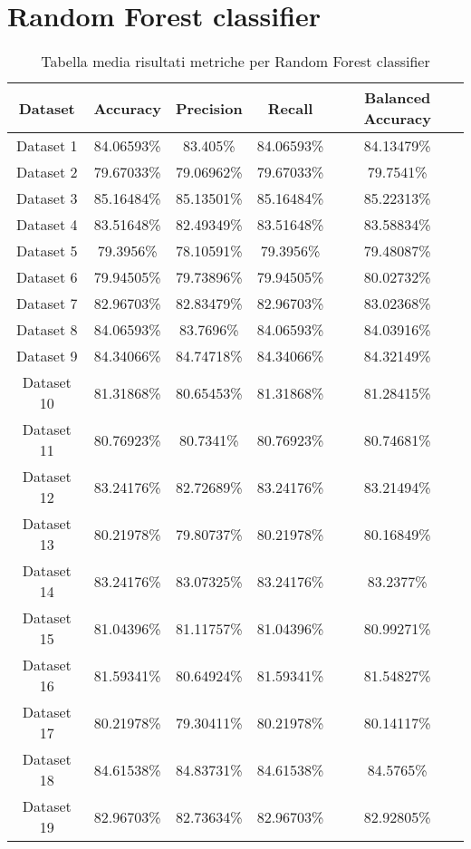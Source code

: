 \section{Random Forest classifier}
\begin{table}
\centering
\caption{Tabella media risultati metriche per Random Forest classifier}
\label{tab:5}
\begin{tabular}{ |c||c|c|c|c| } 
    \hline
    Dataset & Accuracy & Precision & Recall & Balanced Accuracy\\ 
    \hline\hline
    Dataset 1&84.06593\%&83.405\%&84.06593\%&84.13479\%\\
    \hline
    Dataset 2&79.67033\%&79.06962\%&79.67033\%&79.7541\%\\
    \hline
    Dataset 3&85.16484\%&85.13501\%&85.16484\%&85.22313\%\\
    \hline
    Dataset 4&83.51648\%&82.49349\%&83.51648\%&83.58834\%\\
    \hline
    Dataset 5&79.3956\%&78.10591\%&79.3956\%&79.48087\%\\
    \hline
    Dataset 6&79.94505\%&79.73896\%&79.94505\%&80.02732\%\\
    \hline
    Dataset 7&82.96703\%&82.83479\%&82.96703\%&83.02368\%\\
    \hline
    Dataset 8&84.06593\%&83.7696\%&84.06593\%&84.03916\%\\
    \hline
    Dataset 9&84.34066\%&84.74718\%&84.34066\%&84.32149\%\\
    \hline
    Dataset 10&81.31868\%&80.65453\%&81.31868\%&81.28415\%\\
    \hline
    Dataset 11&80.76923\%&80.7341\%&80.76923\%&80.74681\%\\
    \hline
    Dataset 12&83.24176\%&82.72689\%&83.24176\%&83.21494\%\\
    \hline
    Dataset 13&80.21978\%&79.80737\%&80.21978\%&80.16849\%\\
    \hline
    Dataset 14&83.24176\%&83.07325\%&83.24176\%&83.2377\%\\
    \hline
    Dataset 15&81.04396\%&81.11757\%&81.04396\%&80.99271\%\\
    \hline
    Dataset 16&81.59341\%&80.64924\%&81.59341\%&81.54827\%\\
    \hline
    Dataset 17&80.21978\%&79.30411\%&80.21978\%&80.14117\%\\
    \hline
    Dataset 18&84.61538\%&84.83731\%&84.61538\%&84.5765\%\\
    \hline
    Dataset 19&82.96703\%&82.73634\%&82.96703\%&82.92805\%\\

\end{tabular}
\end{table}
